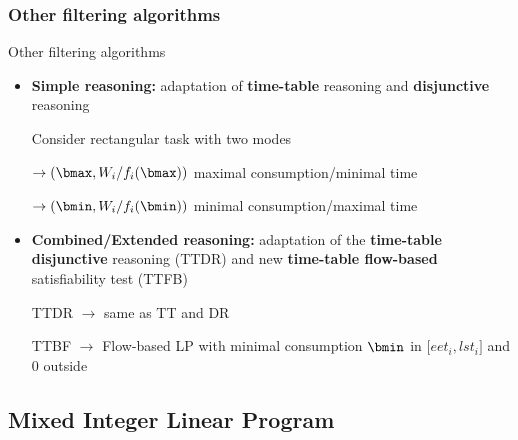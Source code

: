 \subsubsection{Other filtering algorithms}

\begin{frame}{Other filtering algorithms}
\vfill
\begin{itemize}
\item {\bf \color{blue!80!black!80} Simple reasoning: } adaptation of
  {\bf time-table} reasoning and {\bf disjunctive} reasoning
\vfill
\pause
{\color{gray!80!black!80}{\it Idea: } Consider rectangular task with two modes

  $\rightarrow (\bmax, W_i/f_i(\bmax))$ maximal consumption/minimal time

  $\rightarrow (\bmin, W_i/f_i(\bmin))$ minimal consumption/maximal
  time}
  \vfill
\pause
\item {\bf \color{blue!80!black!80} Combined/Extended reasoning: }
  adaptation of the {\bf time-table disjunctive} reasoning (TTDR) and
  new {\bf time-table flow-based} satisfiability test (TTFB)
  \vfill
\pause
  {\color{gray!80!black!80}{\it Idea: } TTDR $\rightarrow$ same as TT and DR

  TTBF $\rightarrow$ Flow-based LP with minimal consumption $\bmin$ in
  ${[}eet_i,lst_i {]}$ and $0$ outside}
\end{itemize}
\vfill
\end{frame}


\subsection{Mixed Integer Linear Program}


